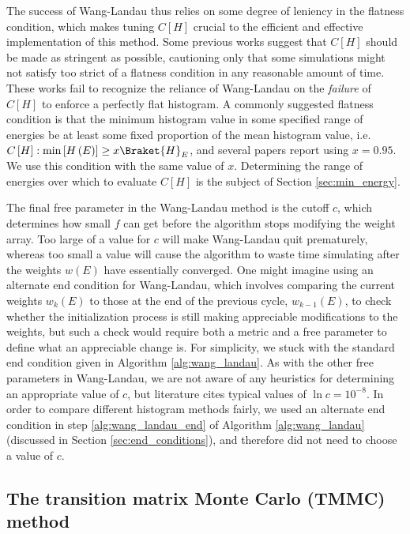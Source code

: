 \documentclass[11pt]{article}
\newcommand{\bk}{\Braket} %
\newcommand{\p}[1]{\left(#1\right)} %
\renewcommand{\sp}[1]{\left[#1\right]} %
\begin{document}
The success of Wang-Landau thus relies on some degree of leniency in
the flatness condition, which makes tuning $C\sp{H}$ crucial to the
efficient and effective implementation of this method. Some previous
works\cite{wang2001determining} suggest that $C\sp{H}$ should be made
as stringent as possible, cautioning only that some simulations might
not satisfy too strict of a flatness condition in any reasonable
amount of time. These works fail to recognize the reliance of
Wang-Landau on the {\it failure} of $C\sp{H}$ to enforce a perfectly
flat histogram. A commonly suggested flatness condition is that the
minimum histogram value in some specified range of energies be at
least some fixed proportion of the mean histogram value, i.e.
$C\sp{H}:\min\sp{H\p{E}}\ge x\bk{H}_E$, and several papers report
using $x=0.95$. We use this condition with the same value of
$x$. Determining the range of energies over which to evaluate
$C\sp{H}$ is the subject of Section \ref{sec:min_energy}.

The final free parameter in the Wang-Landau method is the cutoff $c$,
which determines how small $f$ can get before the algorithm stops
modifying the weight array. Too large of a value for $c$ will make
Wang-Landau quit prematurely, whereas too small a value will cause the
algorithm to waste time simulating after the weights $w\p{E}$ have
essentially converged. One might imagine using an alternate end
condition for Wang-Landau, which involves comparing the current
weights $w_k\p{E}$ to those at the end of the previous cycle,
$w_{k-1}\p{E}$, to check whether the initialization process is still
making appreciable modifications to the weights, but such a check
would require both a metric and a free parameter to define what an
appreciable change is. For simplicity, we stuck with the standard end
condition given in Algorithm \ref{alg:wang_landau}. As with the other
free parameters in Wang-Landau, we are not aware of any heuristics for
determining an appropriate value of $c$, but literature cites typical
values of $\ln c=10^{-8}$. In order to compare different histogram
methods fairly, we used an alternate end condition in step
\ref{alg:wang_landau_end} of Algorithm \ref{alg:wang_landau}
(discussed in Section \ref{sec:end_conditions}), and therefore did not
need to choose a value of $c$.

\subsection{The transition matrix Monte Carlo (TMMC) method}
\label{sec:tmmc}
\end{document}
